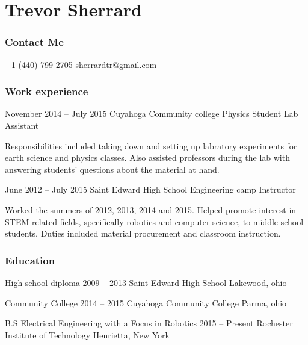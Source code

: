 \documentclass{tccv}
\begin{document}
\part{Trevor Sherrard}
\section{Contact Me}
\begin{eventlist}
    {+1 (440) 799-2705}
    {sherrardtr@gmail.com}
\end{eventlist}

\section{Work experience}

\begin{eventlist}

\item{November 2014 -- July 2015}
     {Cuyahoga Community college}
     {Physics Student Lab Assistant }

Responsibilities included taking down and setting up labratory experiments for earth science and physics classes. Also assisted professors during the lab with answering students' questions about the material at hand.

\item{June 2012 -- July 2015}
     {Saint Edward High School}
     {Engineering camp Instructor}
     
Worked the summers of 2012, 2013, 2014 and 2015. Helped promote interest in STEM related fields, specifically robotics and computer science, to middle school students. Duties included material procurement and classroom instruction.
\end{eventlist}

\section{Education}

\begin{yearlist}

\item[High school diploma]{2009 -- 2013}
     {Saint Edward High School}
     {Lakewood, ohio}

\item[Community College]{2014 -- 2015}
     {Cuyahoga Community College}
     {Parma, ohio}

\item[B.S Electrical Engineering with a Focus in Robotics]{2015 -- Present}
     {Rochester Institute of Technology}
     {Henrietta, New York}

\end{yearlist}
\newline
\newline
\newline
\newline
\newline
\newline
\newline
\end{document}
